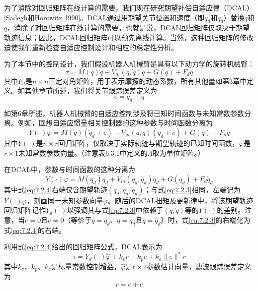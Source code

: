 \documentclass[UTF8]{ctexart}
\begin{document}
为了消除对回归矩阵在线计算的需要，我们现在研究期望补偿自适应律（DCAL）[Sadegh和Horowitz 1990]。DCAL通过用期望关节位置和速度（即$q_d$和$\dot{q}_d$）替换$q$和$\dot{q}$，消除了对回归矩阵在线计算的需要。也就是说，DCAL回归矩阵仅取决于期望轨迹信息；因此，DCAL回归矩阵可以预先离线计算。当然，这种回归矩阵的修改迫使我们重新检查自适应控制设计和相应的稳定性分析。

为了本节中的控制设计，我们假设机器人机械臂是具有以下动力学的旋转机械臂：
\begin{equation}\label{eq:7.2.1}
\tau = M(q)\ddot{q} + V_m(q,\dot{q})\dot{q} + G(q) + F_d\dot{q}
\end{equation}
其中$F_d$是$n \times n$正定对角矩阵，用于表示摩擦的动态系数，所有其他量如第3章中定义。如其他章节所述，我们将关节跟踪误差定义为
\begin{equation}\label{eq:7.2.2}
e = q_d - q
\end{equation}

如第6章所述，机器人机械臂的自适应控制涉及将已知时间函数与未知常数参数分离。例如，回想自适应惯量相关控制器的这种参数与时间函数分离为
\begin{equation}\label{eq:7.2.3}
Y(\cdot)\varphi = M(q)(\ddot{q}_d + \dot{e}) + V_m(q,\dot{q})(\dot{q}_d + e) + G(q) + F_d\dot{q}
\end{equation}
其中$Y(\cdot)$是$n \times r$回归矩阵，仅取决于实际轨迹与期望轨迹的已知时间函数，$\varphi$是$r \times 1$未知常数参数向量。（注意表6.3.1中定义的$\Lambda$取为单位矩阵。）

在DCAL中，参数与时间函数的这种分离为
\begin{equation}\label{eq:7.2.4}
Y(\cdot)\varphi = M(q_d)\ddot{q}_d + V_m(q_d,\dot{q}_d)\dot{q}_d + G(q_d) + F_d\dot{q}_d
\end{equation}
其中式\eqref{eq:7.2.4}右端仅含期望轨迹$(q_d,\dot{q}_d,\ddot{q}_d)$；与式\eqref{eq:7.2.3}相同，左端记为$Y(\cdot)\varphi$，刻画同一未知参数向量$\varphi$。随后的DCAL扭矩及更新律中，将该期望轨迹回归矩阵记作$Y_d(\cdot)$以强调其与式\eqref{eq:7.2.3}中依赖于$(q,\dot{q})$等的$Y(\cdot)$的差别。注意，当$e=0$且$\dot{e}=0$（等价于$q=q_d$、$\dot{q}=\dot{q}_d$且$\ddot{q}=\ddot{q}_d$）时，式\eqref{eq:7.2.3}的右端化为式\eqref{eq:7.2.4}的右端。

利用式\eqref{eq:7.2.4}给出的回归矩阵公式，DCAL表示为
\begin{equation}\label{eq:7.2.5}
\tau = Y_d(\cdot)\hat{\varphi} + k_v r + k_p e + k_a \|e\|^2 r
\end{equation}
其中$k_v$、$k_p$、$k_a$是标量常数控制增益，$\hat{\varphi}$是$r \times 1$参数估计向量，滤波跟踪误差定义为
\begin{equation}\label{eq:7.2.6}
r = \dot{e} + e
\end{equation}
\end{document}
